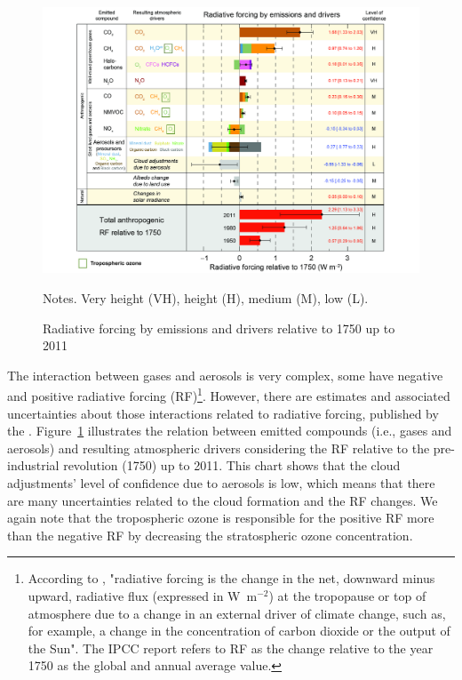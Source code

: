 \begin{figure}[htbp]
  \centering
  \includegraphics[width=13cm]{fig/FigSPM-05.pdf}
  \caption{Radiative forcing by emissions and drivers relative to 1750 up to 2011  \citep[ilustration adapted from][]{IPCC2013} }
  {\scriptsize Notes. Very height (VH), height (H), medium (M), low (L).}
  \label{fig:rf_emi}
\end{figure}

The interaction between gases and aerosols is very complex, some have negative and positive radiative forcing (RF)\footnote{According to \citet{IPCC2013},
"radiative forcing is the change in the net, downward minus upward, radiative flux (expressed in W~m$^{-2}$) at the tropopause or top of atmosphere due to a change in an external driver of climate change, such as, for example, a change in the concentration of carbon dioxide or the output of the Sun".
The IPCC report refers to RF as the change relative to the year 1750 as the global and annual average value.}.
However, there are estimates and associated uncertainties about those interactions related to radiative forcing, published by the \citet{IPCC2013}.
Figure~\ref{fig:rf_emi} illustrates the relation between emitted compounds (i.e., gases and aerosols) and resulting atmospheric drivers considering the RF relative to the pre-industrial revolution (1750) up to 2011.
This chart shows that the cloud adjustments' level of confidence due to aerosols is low, which means that there are many uncertainties related to the cloud formation and the RF changes.
We again note that the tropospheric ozone is responsible for the positive RF more than the negative RF by decreasing the stratospheric ozone concentration. 

